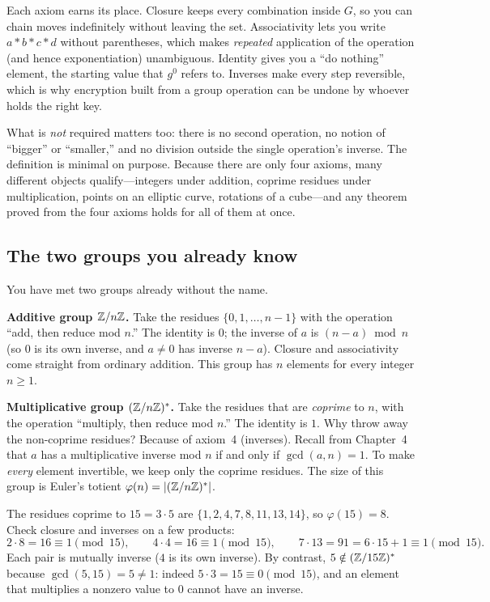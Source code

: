 Each axiom earns its place. Closure keeps every combination inside $G$, so you can chain moves indefinitely without leaving the set. Associativity lets
you write $a \ast b \ast c \ast d$ without parentheses, which makes
\emph{repeated} application of the operation (and hence exponentiation) unambiguous. Identity gives you a
``do nothing'' element, the starting value that $g^0$ refers to. Inverses make every step reversible, which is why encryption built from a
group operation can be undone by whoever holds the right key.

\begin{focusbox}
What is \emph{not} required matters too: there is no second operation, no notion of ``bigger''
or ``smaller,'' and no division outside the single operation's inverse. The definition is minimal on purpose.
Because there are only four axioms, many different objects qualify---integers under
addition, coprime residues under multiplication, points on an elliptic curve, rotations
of a cube---and any theorem proved from the four axioms holds for all of them at once.
\end{focusbox}

\subsection{The two groups you already know}

You have met two groups already without the name.

\textbf{Additive group $\mathbb{Z}/n\mathbb{Z}$.} Take the residues $\{0,1,\dots,n-1\}$ with the
operation ``add, then reduce mod $n$.'' The identity is $0$; the inverse of $a$ is $(n-a) \bmod n$
(so $0$ is its own inverse, and $a \ne 0$ has inverse $n-a$). Closure and associativity come straight from ordinary
addition. This group has $n$ elements for every integer $n \ge 1$.

\textbf{Multiplicative group $(\mathbb{Z}/n\mathbb{Z})^{*}$.} Take the residues that are \emph{coprime} to $n$,
with the operation ``multiply, then reduce mod $n$.'' The identity is $1$. Why throw away the non-coprime residues? Because of axiom~4 (inverses). Recall from Chapter~4
that $a$ has a multiplicative inverse mod $n$ if and only if $\gcd(a,n)=1$. To make
\emph{every} element invertible, we keep only the coprime residues. The size of this group is Euler's totient $\varphi(n) = \lvert(\mathbb{Z}/n\mathbb{Z})^{*}\rvert$.

\begin{example}
\label{ch05:ex-zns15}
The residues coprime to $15 = 3\cdot 5$ are
$\{1,2,4,7,8,11,13,14\}$, so $\varphi(15)=8$. Check closure and inverses on a few products:
\[
  2 \cdot 8 = 16 \equiv 1 \pmod{15}, \qquad
  4 \cdot 4 = 16 \equiv 1 \pmod{15}, \qquad
  7 \cdot 13 = 91 = 6\cdot 15 + 1 \equiv 1 \pmod{15}.
\]
Each pair is mutually inverse ($4$ is its own inverse). By contrast, $5 \notin (\mathbb{Z}/15\mathbb{Z})^{*}$ because
$\gcd(5,15)=5 \neq 1$: indeed $5 \cdot 3 = 15 \equiv 0 \pmod{15}$, and an element that multiplies a nonzero value to $0$ cannot have an inverse.
\end{example}

